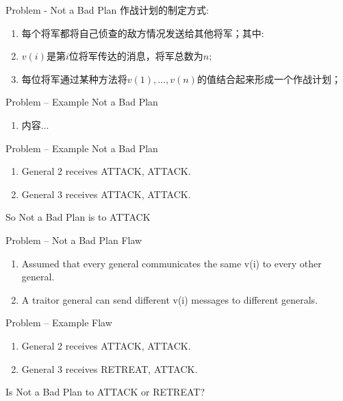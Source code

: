 \documentclass[11pt]{beamer}
\begin{document}
\begin{frame}{Problem - Not a Bad Plan}
作战计划的制定方式:
\begin{enumerate}
	\item 每个将军都将自己侦查的敌方情况发送给其他将军；其中:
	
	\item $v(i)$是第$i$位将军传达的消息，将军总数为$n$;
	
	\item 每位将军通过某种方法将$v(1),...,v(n)$的值结合起来形成一个作战计划；
\end{enumerate}
\end{frame}


\begin{frame}{Problem – Example Not a Bad Plan
}
	\begin{enumerate}
		\item 内容...
	\end{enumerate}
\end{frame}


\begin{frame}{Problem – Example Not a Bad Plan
}
	\begin{enumerate}
		\item General 2 receives ATTACK, ATTACK.
		\item General 3 receives ATTACK, ATTACK.
	\end{enumerate}
So Not a Bad Plan is to ATTACK
\end{frame}

\begin{frame}{Problem – Not a Bad Plan Flaw
}
	\begin{enumerate}
		\item Assumed that every general communicates the same v(i) to every other general.
		\item A traitor general can send different v(i) messages to different generals.
	\end{enumerate}
\end{frame}

\begin{frame}{Problem – Example Flaw}
	\begin{enumerate}
		\item General 2 receives ATTACK, ATTACK.
		\item General 3 receives RETREAT, ATTACK.
	\end{enumerate}
Is Not a Bad Plan to ATTACK or RETREAT?

\end{frame}
\end{document}
